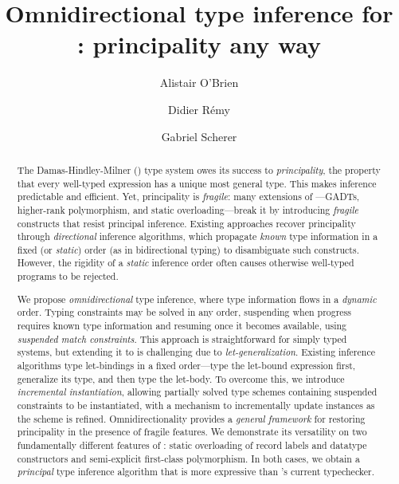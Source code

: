 \documentclass[acmsmall,screen,nonacm%
\Anonymous{,anonymous}{}%
\Final{}{,review}%
]{acmart}
\author{Alistair O'Brien}
\affiliation{
  \institution{University of Cambridge}
  \city{Cambridge}
  \country{United Kingdom}
}
\author{Didier R\'emy}
\affiliation{
  \institution{INRIA}
  \city{INRIA}
  \city{Inria Paris Center}
  \country{France}
}
\author{Gabriel Scherer}
\affiliation{
  \institution{INRIA \& IRIF, Universit\'e Paris Cit\'e}
  \city{Paris}
  \country{France}
}
\title{Omnidirectional type inference for \ML: principality any way}
\begin{document}
\begin{abstract}

  The Damas-Hindley-Milner (\ML) type system owes its success to
  \emph{principality}, the property that every well-typed expression has a
  unique most general type. This makes inference predictable and efficient.
  Yet, principality is \emph{fragile}: many extensions of \ML---GADTs,
  higher-rank polymorphism, and static overloading---break it by introducing
  \emph{fragile} constructs that resist principal inference. Existing
  approaches recover principality through \emph{directional} inference
  algorithms, which propagate \emph{known} type information in a fixed (or
  \emph{static}) order (\eg as in bidirectional typing) to disambiguate such
  constructs. However, the rigidity of a \emph{static} inference order often
  causes otherwise well-typed programs to be rejected.


  We propose \emph{omnidirectional} type inference, where type information
  flows in a \emph{dynamic} order. Typing constraints may be solved in any
  order, suspending when progress requires known type information and resuming
  once it becomes available, using \emph{suspended match constraints}. This
  approach is straightforward for simply typed systems, but extending it to \ML
  is challenging due to \emph{let-generalization}. Existing \ML inference
  algorithms type let-bindings in a fixed order---type the let-bound expression 
  first, generalize its type, and then type the let-body. To overcome this, we
  introduce \emph{incremental instantiation}, allowing partially solved type
  schemes containing suspended constraints to be instantiated, with a mechanism
  to incrementally update instances as the scheme is refined.
  Omnidirectionality provides a \emph{general framework} for restoring
  principality in
  the presence of fragile features. We demonstrate its versatility on two
  fundamentally different features of \OCaml: static overloading of record
  labels and datatype constructors and semi-explicit first-class polymorphism.
  In both cases, we obtain a \emph{principal} type inference algorithm that is
  more expressive than \OCaml's current typechecker.

\end{abstract}
\maketitle
\end{document}
